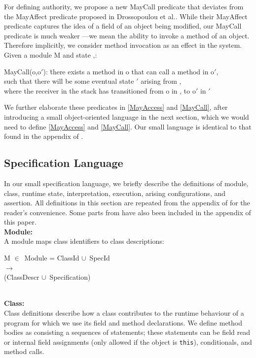 \documentclass[a4paper,11pt,twoside]{article}
\newenvironment{logic}
{\begin{minipage}[c]{\linewidth}  \sffamily \mdseries \begin{tabbing}}
{\end{tabbing}\end{minipage}\vspace{0.3em}}
\newcommand{\loin}{$\in$}
\newcommand{\losigma}{\text{$\upsigma$}}
\newcommand{\locup} {$\cup$}
\newcommand{\ablock} {\null\qquad}
\begin{document}
For defining authority, we propose a new MayCall predicate that deviates from the MayAffect predicate proposed in Drossopoulou et al.\cite{drossopoulou2016}. While their MayAffect predicate captures the idea of a field of an object being modified, our MayCall predicate is much weaker ---we mean the ability to invoke a method of an object. Therefore implicitly, we consider method invocation as an effect in the system. Given a module M and state \losigma,:
\begin{tabbing}
MayCall(o,o$'$): \=there exists a method in o that can call a method in o$'$,\\ \> such that there will be some eventual state \losigma$'$ arising from \losigma,\\ \> where the receiver in the stack has transitioned from o in \losigma, to o$'$ in \losigma$'$\\
\end{tabbing}

We further elaborate these predicates in \cref{MayAccess} and \cref{MayCall}, after introducing a small object-oriented language in the next section, which we would need to define \cref{MayAccess} and \cref{MayCall}. Our small language is identical to that found in the appendix of \cite{drossopoulou2015b}.
\subsection{Specification Language}\label{sec:speclang}
In our small specification language, we briefly describe the definitions of module, class, runtime state, interpretation, execution, arising configurations, and assertion. All definitions in this section are repeated from the appendix of \cite{drossopoulou2015b} for the reader's convenience. Some parts from \cite{drossopoulou2015b} have also been included in the appendix of this paper. \\

\textbf{Module:}\\
A module maps class identifiers to class descriptions:\\
\begin{logic}
M \loin\ Module = ClassId \locup\ SpecId\\\ablock\qquad\qquad\quad $\rightarrow$ \\
\ablock \qquad \qquad \quad (ClassDescr \locup\ Specification)
\end{logic}\\

\textbf{Class:}\\
Class definitions describe how a class contributes to the runtime behaviour of a program for which we use its field and method declarations. We define method bodies as consisting a sequences of statements; these statements can be field read or internal field assignments (only allowed if the object is \texttt{this}), conditionals, and method calls.\\
\end{document}
